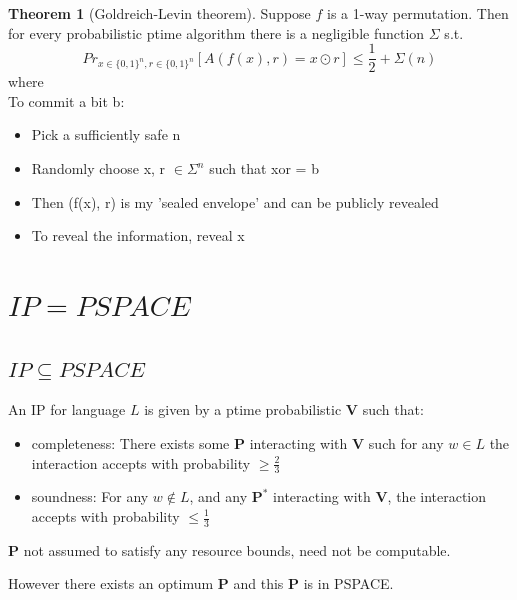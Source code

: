 \documentclass[a4paper,12pt]{article}
\theoremstyle{definition}
\newtheorem{theorem}[counter]{Theorem}
\theoremstyle{remark}
\begin{document}
\begin{theorem}[Goldreich-Levin theorem]
    Suppose $f$ is a 1-way permutation. Then for every probabilistic ptime algorithm there is a negligible function 
    $\Sigma$ s.t.
    \begin{equation*}
        Pr_{x \in \{0, 1\}^n, r \in \{0, 1\}^n} [A(f(x), r) = x \odot r] \leq \frac{1}{2} + \Sigma(n)
    \end{equation*}
    where
    \begin{equation*}
        [x \odot r = \sum_{i=1}^{n} x_i r_i mod 2]
    \end{equation*}
    To commit a bit b:
    \begin{itemize}
        \item Pick a sufficiently safe n
        \item Randomly choose x, r $\in \Sigma^n$ such that xor = b
        \item Then (f(x), r) is my 'sealed envelope' and can be publicly revealed
        \item To reveal the information, reveal x
    \end{itemize}
\end{theorem}







\newpage
\section{$IP = PSPACE$}
\subsection{$IP \subseteq PSPACE$}
An IP for language $L$ is given by a ptime probabilistic \textbf{V} such that:
\begin{itemize}
    \item completeness: There exists some \textbf{P} interacting with \textbf{V} such for any $w \in L$ the interaction accepts with probability $\geq \frac{2}{3}$
    \item soundness: For any $w \notin L$, and any $\textbf{P}^*$ interacting with \textbf{V}, the interaction accepts with probability $\leq \frac{1}{3}$  
\end{itemize}

\textbf{P} not assumed to satisfy any resource bounds, need not be computable.

However there exists an optimum \textbf{P} and this \textbf{P} is in PSPACE.
\end{document}

